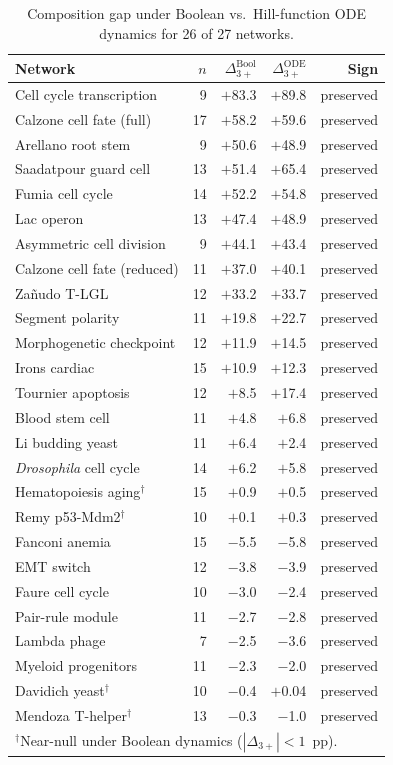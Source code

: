 \documentclass[10pt]{article}
\begin{document}
\begin{table}[h]
\centering
\caption{Composition gap under Boolean vs.\ Hill-function ODE
dynamics for 26 of 27 networks.}
\begin{tabular}{lrrrr}
\toprule
Network & $n$ & $\Delta_{3+}^{\mathrm{Bool}}$ & $\Delta_{3+}^{\mathrm{ODE}}$ & Sign \\
\midrule
Cell cycle transcription & 9 & $+$83.3 & $+$89.8 & preserved \\
Calzone cell fate (full) & 17 & $+$58.2 & $+$59.6 & preserved \\
Arellano root stem & 9 & $+$50.6 & $+$48.9 & preserved \\
Saadatpour guard cell & 13 & $+$51.4 & $+$65.4 & preserved \\
Fumia cell cycle & 14 & $+$52.2 & $+$54.8 & preserved \\
Lac operon & 13 & $+$47.4 & $+$48.9 & preserved \\
Asymmetric cell division & 9 & $+$44.1 & $+$43.4 & preserved \\
Calzone cell fate (reduced) & 11 & $+$37.0 & $+$40.1 & preserved \\
Za\~nudo T-LGL & 12 & $+$33.2 & $+$33.7 & preserved \\
Segment polarity & 11 & $+$19.8 & $+$22.7 & preserved \\
Morphogenetic checkpoint & 12 & $+$11.9 & $+$14.5 & preserved \\
Irons cardiac & 15 & $+$10.9 & $+$12.3 & preserved \\
Tournier apoptosis & 12 & $+$8.5 & $+$17.4 & preserved \\
Blood stem cell & 11 & $+$4.8 & $+$6.8 & preserved \\
Li budding yeast & 11 & $+$6.4 & $+$2.4 & preserved \\
\emph{Drosophila} cell cycle & 14 & $+$6.2 & $+$5.8 & preserved \\
Hematopoiesis aging$^\dagger$ & 15 & $+$0.9 & $+$0.5 & preserved \\
Remy p53-Mdm2$^\dagger$ & 10 & $+$0.1 & $+$0.3 & preserved \\
Fanconi anemia & 15 & $-$5.5 & $-$5.8 & preserved \\
EMT switch & 12 & $-$3.8 & $-$3.9 & preserved \\
Faure cell cycle & 10 & $-$3.0 & $-$2.4 & preserved \\
Pair-rule module & 11 & $-$2.7 & $-$2.8 & preserved \\
Lambda phage & 7 & $-$2.5 & $-$3.6 & preserved \\
Myeloid progenitors & 11 & $-$2.3 & $-$2.0 & preserved \\
Davidich yeast$^\dagger$ & 10 & $-$0.4 & $+$0.04 & preserved \\
Mendoza T-helper$^\dagger$ & 13 & $-$0.3 & $-$1.0 & preserved \\
\bottomrule
\multicolumn{5}{l}{\footnotesize $^\dagger$Near-null under Boolean dynamics ($|\Delta_{3+}| < 1$~pp).} \\
\end{tabular}
\end{table}
\end{document}
